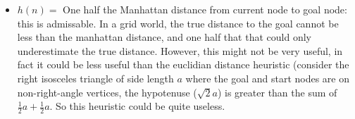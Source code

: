 \documentclass[12pt]{article}
\newenvironment{questionList}{
\newcounter{ctr}
\begin{list}{\textbf{Question \arabic{ctr}.} \\ \\ }
  {\usecounter{ctr}}
  }{
\end{list}
}
\begin{document}
\begin{questionList}
\begin{itemize}
  \item $h(n)= $ One half the Manhattan distance from current node to goal node: this is  admissable. In a grid world, the true distance to the goal cannot be less than the manhattan distance, and one half that that could only underestimate the true distance. However, this might not be very useful, in fact it could be less useful than the euclidian distance heuristic (consider the right isosceles triangle of side length $a$ where the goal and start nodes are on non-right-angle vertices, the hypotenuse ($\sqrt{2}a$) is greater than the sum of  $\frac{1}{2}a + \frac{1}{2}a$. So this heuristic could be quite useless. 
 
\end{itemize}

\end{questionList}
\end{document}
